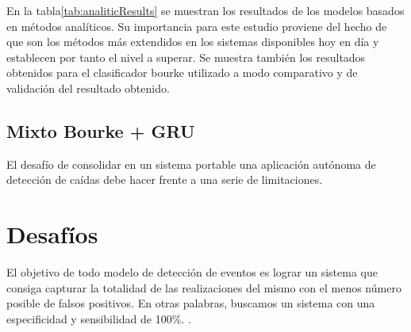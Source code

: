 
En la tabla\ref{tab:analiticResults} se muestran los resultados de los modelos basados en métodos analíticos. Su importancia para este estudio proviene del hecho de que son los métodos más extendidos en los sistemas disponibles hoy en día y establecen por tanto el nivel a superar. Se muestra también los resultados obtenidos para el clasificador bourke utilizado a modo comparativo y de validación del resultado obtenido.

\begin{comment}
\tablas{tab:analiticResults}{Resultados de sistemas basados en métodos analíticos}{l|c|c|c|c}{
              & \emph{iFell} & \emph{iFell} & \emph{SisFALL} & \emph{SisFALL} \\
              & Bourke    & Hibrido & Cotas(SumVect)  & Cotas(SV) 100\%Sens \\ \midrule
Sensitividad (\%) & 99,4  &    91,13   & 94,28 & 100  \\
Especificidad (\%) & 29,7 &   42,88    & 96,13 & 32,9 \\
Accuracy (\%) & 64,55 &     67  & 95,21 & 66,43 \\
Tiempo (s)    & 0     & 2,5     & 0       & \\
}{3}
\warn{Falta extraer Lim2014 con sisfall y comparar}
\end{comment}
\subsection{Mixto Bourke + GRU}





El desafío de consolidar en un sistema portable una aplicación autónoma de detección de caídas debe hacer frente a una serie de limitaciones.

\section{Desafíos}
 El objetivo de todo modelo de detección de eventos es lograr un sistema que consiga capturar la totalidad de las realizaciones del mismo con el menos número posible de falsos positivos. En otras palabras, buscamos un sistema con una especificidad y sensibilidad de 100\%\cite{Noury2007}. .

